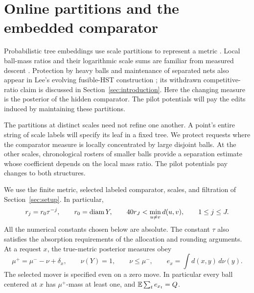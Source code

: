 \section{Online partitions and the embedded comparator}
\label{sec:partitions}

Probabilistic tree embeddings use scale partitions to represent a metric
\cite{Bartal96,Bartal98,FRT04}. Local ball-mass ratios and their
logarithmic scale sums are familiar from measured descent
\cite[Lemma~1.7 and Section~1.3]{KLMN05}. Protection by heavy balls
and maintenance of separated nets also appear in Lee's evolving
fusible-HST construction \cite[Sections~3.1.2--3.2]{Lee18}; its
withdrawn competitive-ratio claim is discussed in
Section~\ref{sec:introduction}. Here the changing measure is the
posterior of the hidden comparator. The pilot potentials will pay
the edits induced by maintaining these partitions.

The partitions at distinct scales need not refine one another.  A point's
entire string of scale labels will specify its leaf in a fixed tree.  We
protect requests where the comparator measure is locally concentrated by
large disjoint balls.  At the other scales, chronological rosters of smaller
balls provide a separation estimate whose coefficient depends on the local
mass ratio.  The pilot potentials pay changes to both structures.

We use the finite metric, selected labeled comparator, scales, and filtration
of Section~\ref{sec:setup}.  In particular,
\[
 r_j=r_0\tau^{-j},\qquad r_0=\operatorname{diam} Y,\qquad
 40r_J<\min_{u\ne v}d(u,v),\qquad 1\le j\le J.
\]
All the numerical constants chosen below are absolute.  The constant
\(\tau\) also satisfies the absorption requirements of the allocation and
rounding arguments.  At a request \(x\), the true-metric posterior measures
obey
\begin{equation}\label{eq:partition-mover}
 \mu^+=\mu^--\nu+\delta_x,\qquad
 \nu(Y)=1,\qquad \nu\le\mu^-,\qquad
 e_x=\int d(x,y)\,d\nu(y).
\end{equation}
The selected mover is specified even on a zero move.  In particular every
ball centered at \(x\) has \(\mu^+\)-mass at least one, and
\(\mathbb E\sum_t e_{x_t}=Q\).

